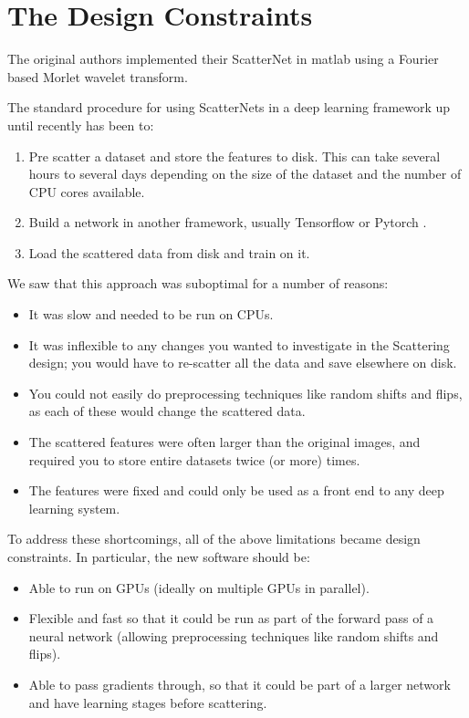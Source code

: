 \section{The Design Constraints}
The original authors implemented their ScatterNet in matlab \cite{} using
a Fourier based Morlet wavelet transform. 

The standard procedure for using ScatterNets in a deep learning
framework up until recently has been to:
\begin{enumerate}
  \item Pre scatter a dataset and store the features to disk. This can take
    several hours to several days depending on the size of the dataset and the
    number of CPU cores available.
  \item Build a network in another framework, usually Tensorflow \cite{}
    or Pytorch \cite{}.
  \item Load the scattered data from disk and train on it.
\end{enumerate} 
We saw that this approach was suboptimal for a number of reasons:
\begin{itemize}
  \item It was slow and needed to be run on CPUs.
  \item It was inflexible to any changes you wanted to investigate in the
    Scattering design; you would have to re-scatter all the data and save
    elsewhere on disk.
  \item You could not easily do preprocessing techniques like random shifts and
    flips, as each of these would change the scattered data.
  \item The scattered features were often larger than the original images, and 
    required you to store entire datasets twice (or more) times.
  \item The features were fixed and could only be used as a front end to any
    deep learning system.
\end{itemize}

To address these shortcomings, all of the above limitations became design
constraints. In particular, the new software should be:
\begin{itemize}
  \item Able to run on GPUs (ideally on multiple GPUs in parallel).
  \item Flexible and fast so that it could be run as part of the forward pass of
    a neural network (allowing preprocessing techniques like random shifts and
    flips).
  \item Able to pass gradients through, so that it could be part of a larger
    network and have learning stages before scattering.
\end{itemize}

